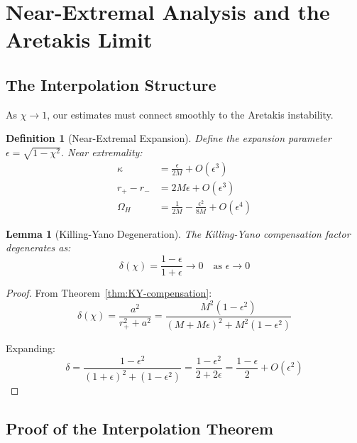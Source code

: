 \documentclass[12pt,a4paper]{article}
\newtheorem{lemma}[theorem]{Lemma}
\newtheorem{definition}[theorem]{Definition}
\begin{document}
\section{Near-Extremal Analysis and the Aretakis Limit}

\subsection{The Interpolation Structure}

As $\chi \to 1$, our estimates must connect smoothly to the Aretakis instability.

\begin{definition}[Near-Extremal Expansion]
Define the expansion parameter $\epsilon = \sqrt{1-\chi^2}$. Near extremality:
\begin{align}
\kappa &= \frac{\epsilon}{2M} + O(\epsilon^3) \\
r_+ - r_- &= 2M\epsilon + O(\epsilon^3) \\
\Omega_H &= \frac{1}{2M} - \frac{\epsilon^2}{8M} + O(\epsilon^4)
\end{align}
\end{definition}

\begin{lemma}[Killing-Yano Degeneration]\label{lem:KY-degen}
The Killing-Yano compensation factor degenerates as:
\begin{equation}
\delta(\chi) = \frac{1-\epsilon}{1+\epsilon} \to 0 \quad \text{as } \epsilon \to 0
\end{equation}
\end{lemma}

\begin{proof}
From Theorem~\ref{thm:KY-compensation}:
\begin{equation}
\delta(\chi) = \frac{a^2}{r_+^2 + a^2} = \frac{M^2(1-\epsilon^2)}{(M+M\epsilon)^2 + M^2(1-\epsilon^2)}
\end{equation}

Expanding:
\begin{equation}
\delta = \frac{1-\epsilon^2}{(1+\epsilon)^2 + (1-\epsilon^2)} = \frac{1-\epsilon^2}{2 + 2\epsilon} = \frac{1-\epsilon}{2} + O(\epsilon^2)
\end{equation}
\end{proof}

\subsection{Proof of the Interpolation Theorem}
\end{document}
